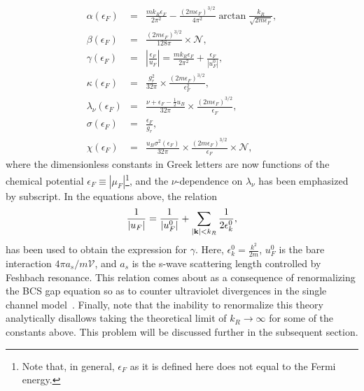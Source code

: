 \documentclass[a4paper,10pt]{article}
\begin{document}
\begin{eqnarray}
\label{greek_consts_chempot}
\alpha\left(\epsilon_F\right)  &=& \frac{mk_R\epsilon_F}{2\pi^2} - \frac{\left(2m\epsilon_F\right)^{3/2}}{4\pi^2} \arctan{\frac{k_R}{\sqrt{2m\epsilon_F}}},\nonumber \\
\beta\left(\epsilon_F\right)   &=& \frac{\left( {2m\epsilon_F} \right)^{3/2}}{128\pi}\times\mathcal{N}, \nonumber \\
\gamma\left(\epsilon_F\right)  &=&  |\frac{\epsilon_F}{u_F}| =\frac{mk_R\epsilon_F}{2\pi^2}+\frac{\epsilon_F}{|u^0_F|} , \nonumber \\
\kappa\left(\epsilon_F\right)  &=&  \frac{g^2_r}{32\pi}\times \frac{\left(2m\epsilon_F\right)^{3/2}}{\epsilon_F^2},\nonumber \\
\lambda_\nu\left(\epsilon_F\right) &=&  \frac{\nu+\epsilon_F-\frac{1}{2}u_B}{32\pi}\times \frac{\left(2m\epsilon_F\right)^{3/2}}{\epsilon_F}, \nonumber \\
\sigma\left(\epsilon_F\right)  &=&   \frac{\epsilon_F}{g_r},\nonumber \\
\chi\left(\epsilon_F\right)    &=&  \frac{u_B\sigma^2\left(\epsilon_F\right)}{32\pi}\times \frac{\left(2m\epsilon_F\right)^{3/2}}{\epsilon_F}\times\mathcal{N}, 
\end{eqnarray}
where the dimensionless constants in Greek letters are now functions of the chemical potential $\epsilon_F\equiv|\mu_F|$\footnote{Note that, in general, $\epsilon_F$ as it is defined here does not equal to the Fermi energy.}, and the $\nu$-dependence on $\lambda_\nu$ has been emphasized by subscript. In the equations above, the relation
\begin{equation}
\frac{1}{|u_F|} = \frac{1}{|u^0_F|}+\sum_{|{\bf k}|<k_R}\frac{1}{2\epsilon^0_k},
\end{equation}
has been used to obtain the expression for $\gamma$. Here, $\epsilon^0_k = \frac{k^2}{2m}$, $u^0_F$ is the bare interaction $4\pi a_s/m\mathcal{V}$, and $a_s$ is the s-wave scattering length controlled by Feshbach resonance. This relation comes about as a consequence of renormalizing the BCS gap equation so as to counter ultraviolet divergences in the single channel model~\cite{randeria:fermigas,randeria:bcsbec2d,huang:bcsbecgp}.  { Finally, note that the inability to renormalize this theory analytically disallows taking the theoretical limit of $k_R\rightarrow\infty$ for some of the constants above. This problem will be discussed further in the subsequent section.}
\end{document}
